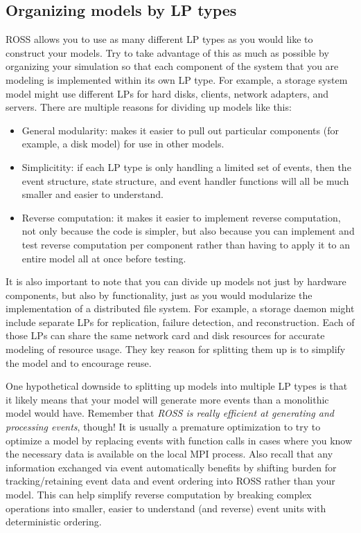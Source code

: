 \documentclass[conference,10pt,compsocconf,onecolumn]{IEEEtran}
\begin{document}
\subsection{Organizing models by LP types}

ROSS allows you to use as many different LP types as you would like to
construct your models.  Try to take advantage of this as much as possible by
organizing your simulation so that each component of the system that you are
modeling is implemented within its own LP type.  For example, a storage
system model might use different LPs for hard disks, clients, network
adapters, and servers.  There are multiple reasons for dividing up models
like this:

\begin{itemize}
\item General modularity: makes it easier to pull out particular components
(for example, a disk model) for use in other models.
\item Simplicitity: if each LP type is only handling a limited set of
events, then the event structure, state structure, and event handler
functions will all be much smaller and easier to understand.
\item Reverse computation: it makes it easier to implement reverse
computation, not only because the code is simpler, but also because you can
implement and test reverse computation per component rather than having to
apply it to an entire model all at once before testing.
\end{itemize}

It is also important to note that you can divide up models not just by
hardware components, but also by functionality, just as
you would modularize the implementation of a distributed file system.  For
example, a storage daemon might include separate LPs for replication, failure
detection, and reconstruction.  Each of those LPs can share the same network
card and disk resources for accurate modeling of resource usage.  They key
reason for splitting them up is to simplify the model and to encourage
reuse.

One hypothetical downside to splitting up models into multiple LP types is that it likely
means that your model will generate more events than a monolithic model
would have.  Remember that \emph{ROSS is really efficient at generating and
processing events}, though!  It is usually a premature optimization to try to optimize a model by
replacing events with function calls in cases where you know the necessary
data is available on the local MPI process.  Also recall that any information
exchanged via event automatically benefits by shifting burden for
tracking/retaining event data and event ordering into ROSS rather than your
model.  This can help simplify reverse computation by breaking complex
operations into smaller, easier to understand (and reverse) event units with
deterministic ordering.
\end{document}
